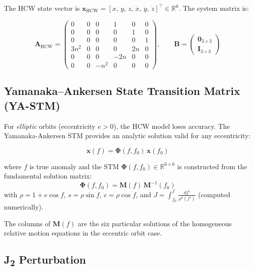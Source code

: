 \documentclass[12pt, a4paper]{article}
\newcommand{\vx}{\mathbf{x}}
\newcommand{\mA}{\mathbf{A}}
\newcommand{\mB}{\mathbf{B}}
\newcommand{\HCW}{\mathrm{HCW}}
\begin{document}
The HCW state vector is $\vx_{\HCW} = [x,\, y,\, z,\, \dot{x},\, \dot{y},\,
\dot{z}]^\top \in \mathbb{R}^6$. The system matrix is:

\begin{equation}
\mA_{\HCW} =
\begin{pmatrix}
0 & 0 & 0 & 1 & 0 & 0 \\
0 & 0 & 0 & 0 & 1 & 0 \\
0 & 0 & 0 & 0 & 0 & 1 \\
3n^2 & 0 & 0 & 0 & 2n & 0 \\
0 & 0 & 0 & -2n & 0 & 0 \\
0 & 0 & -n^2 & 0 & 0 & 0
\end{pmatrix}, \qquad
\mB = \begin{pmatrix} \mathbf{0}_{3\times3} \\ \mathbf{I}_{3\times3} \end{pmatrix}
\end{equation}

\subsection{Yamanaka--Ankersen State Transition Matrix (YA-STM)}

For \emph{elliptic} orbits (eccentricity $e > 0$), the HCW model loses
accuracy. The Yamanaka-Ankersen STM provides an analytic solution valid
for any eccentricity:

\begin{formulabox}[title=YA State Transition Matrix]
\begin{equation}
\vx(f) = \bm{\Phi}(f, f_0)\, \vx(f_0)
\end{equation}

where $f$ is true anomaly and the STM $\bm{\Phi}(f, f_0) \in
\mathbb{R}^{6\times6}$ is constructed from the fundamental solution
matrix:
\begin{equation}
\bm{\Phi}(f,f_0) = \mathbf{M}(f)\,\mathbf{M}^{-1}(f_0)
\end{equation}
with $\rho = 1 + e\cos f$, $s = \rho \sin f$, $c = \rho \cos f$,
and $J = \int_{f_0}^{f} \frac{df'}{\rho^2(f')}$ (computed numerically).

The columns of $\mathbf{M}(f)$ are the six particular solutions of the
homogeneous relative motion equations in the eccentric orbit case.
\end{formulabox}

\subsection{J\textsubscript{2} Perturbation}
\end{document}
